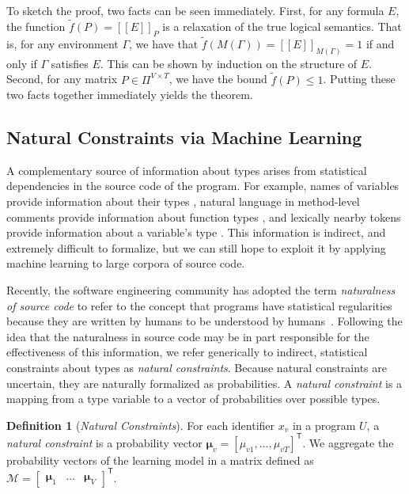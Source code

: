 \documentclass[sigplan,10pt,review,anonymous]{acmart} %
\newcommand{\qqpi}[2]{[\![#2]\!]_{#1}}
\theoremstyle{plain}
\theoremstyle{remark}
\theoremstyle{definition}
\newtheorem{defn}{Definition}[section]
\begin{document}
To sketch the proof, two facts can be seen immediately.
First, for any formula $E$, the function $\tilde{f}(P) = \qqpi{P}{E}$ is a relaxation
of the true logical semantics. That is, for any environment $\Gamma$, we have that
$\tilde{f}(M(\Gamma)) = \qqpi{M(\Gamma)}{E} = 1$ if and only if $\Gamma$ satisfies $E.$ This can be shown
by induction on the structure of $E$.
Second, for any matrix $P \in \Pi^{V \times T}$,
we have the bound $\tilde{f}(P) \leq 1$. Putting these two facts together
immediately yields the theorem.


\subsection{Natural Constraints via Machine Learning}\label{ssec:natcon}

A complementary source of information about types arises from statistical dependencies
in the source code of the program.  For example, names of variables provide
information about their types \cite{xu16}, natural language in
method-level comments provide information about function types \cite{malik19},
and lexically nearby tokens provide information
about a variable's type \cite{hellendoorn18}.
This information is indirect, and extremely difficult to formalize,
but we can still hope to exploit it by applying machine learning
to large corpora of source code.

Recently, the software engineering
community has adopted the term \emph{naturalness of source code} to refer to
the concept that programs have statistical regularities because
they are written by humans to be
understood by humans~\citep{hindle12}.
Following the idea that the naturalness in source code may be in part responsible
for the effectiveness of this information, we
refer generically to indirect, statistical
constraints about types as \emph{natural constraints}.
Because natural constraints are uncertain, they are naturally formalized
as probabilities.
A \emph{natural constraint} is a mapping from a type variable to a vector
of probabilities
over possible types.
\begin{defn}[\emph{Natural Constraints}]\label{eq:natural}
	For each identifier $x_v$ in a program $U$,
	a \emph{natural constraint} is a probability vector $\bm{\mu}_v = [\mu_{v1}, \ldots, \mu_{vT}]^\mathsf{T}$.
	We aggregate the probability vectors of the learning model in a matrix
	defined as $\mathcal{M} = \begin{bmatrix} \bm{\mu}_1 & \ldots & \bm{\mu}_{V} \end{bmatrix}^\mathsf{T}$.
\end{defn}
\end{document}
